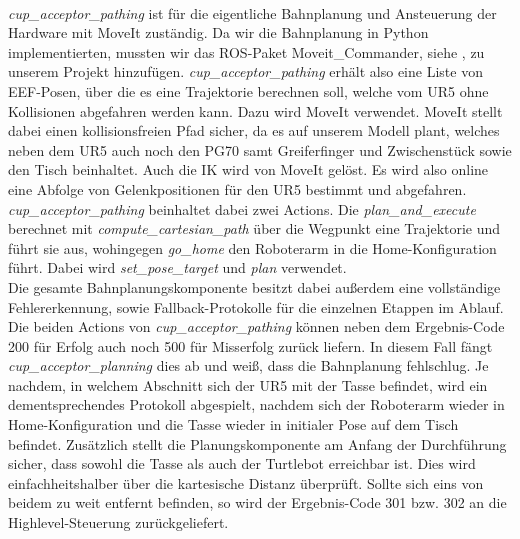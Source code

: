 \newline \\
\textit{cup\_acceptor\_pathing} ist für die eigentliche Bahnplanung und Ansteuerung der Hardware mit MoveIt zuständig. Da wir die Bahnplanung in Python implementierten, mussten wir das ROS-Paket \glqq Moveit\_Commander\grqq, siehe \cite{MoveItCommander}, zu unserem Projekt hinzufügen. \textit{cup\_acceptor\_pathing} erhält also eine Liste von EEF-Posen, über die es eine Trajektorie berechnen soll, welche vom UR5 ohne Kollisionen abgefahren werden kann. Dazu wird MoveIt verwendet. MoveIt stellt dabei einen kollisionsfreien Pfad sicher, da es auf unserem Modell plant, welches neben dem UR5 auch noch den PG70 samt Greiferfinger und Zwischenstück sowie den Tisch beinhaltet. Auch die IK wird von MoveIt gelöst. Es wird also online eine Abfolge von Gelenkpositionen für den UR5 bestimmt und abgefahren. \textit{cup\_acceptor\_pathing} beinhaltet dabei zwei Actions. Die \textit{plan\_and\_execute} berechnet mit \textit{compute\_cartesian\_path} über die Wegpunkt eine Trajektorie und führt sie aus, wohingegen \textit{go\_home} den Roboterarm in die Home-Konfiguration führt. Dabei wird \textit{set\_pose\_target} und \textit{plan} verwendet.
\newline \\
Die gesamte Bahnplanungskomponente besitzt dabei außerdem eine vollständige Fehlererkennung, sowie Fallback-Protokolle für die einzelnen Etappen im Ablauf. Die beiden Actions von \textit{cup\_acceptor\_pathing} können neben dem Ergebnis-Code 200 für Erfolg auch noch 500 für Misserfolg zurück liefern. In diesem Fall fängt \textit{cup\_acceptor\_planning} dies ab und weiß, dass die Bahnplanung fehlschlug. Je nachdem, in welchem Abschnitt sich der UR5 mit der Tasse befindet, wird ein dementsprechendes Protokoll abgespielt, nachdem sich der Roboterarm wieder in Home-Konfiguration und die Tasse wieder in initialer Pose auf dem Tisch befindet. Zusätzlich stellt die Planungskomponente am Anfang der Durchführung sicher, dass sowohl die Tasse als auch der Turtlebot erreichbar ist. Dies wird einfachheitshalber über die kartesische Distanz überprüft. Sollte sich eins von beidem zu weit entfernt befinden, so wird der Ergebnis-Code 301 bzw. 302 an die Highlevel-Steuerung zurückgeliefert.
